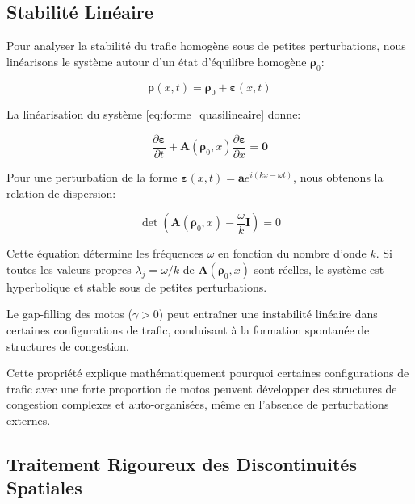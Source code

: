 \subsection{Stabilité Linéaire}
\label{subsec:stabilite_lineaire}

Pour analyser la stabilité du trafic homogène sous de petites perturbations, nous linéarisons le système autour d'un état d'équilibre homogène $\boldsymbol{\rho}_0$:

\begin{equation}
\boldsymbol{\rho}(x,t) = \boldsymbol{\rho}_0 + \boldsymbol{\varepsilon}(x,t)
\end{equation}

La linéarisation du système \eqref{eq:forme_quasilineaire} donne:

\begin{equation}
\frac{\partial \boldsymbol{\varepsilon}}{\partial t} + \mathbf{A}(\boldsymbol{\rho}_0, x) \frac{\partial \boldsymbol{\varepsilon}}{\partial x} = \mathbf{0}
\end{equation}

Pour une perturbation de la forme $\boldsymbol{\varepsilon}(x,t) = \boldsymbol{a} e^{i(kx-\omega t)}$, nous obtenons la relation de dispersion:

\begin{equation}
\det(\mathbf{A}(\boldsymbol{\rho}_0, x) - \frac{\omega}{k}\mathbf{I}) = 0
\end{equation}

Cette équation détermine les fréquences $\omega$ en fonction du nombre d'onde $k$. Si toutes les valeurs propres $\lambda_j = \omega/k$ de $\mathbf{A}(\boldsymbol{\rho}_0, x)$ sont réelles, le système est hyperbolique et stable sous de petites perturbations.

\begin{proposition}
Le gap-filling des motos ($\gamma > 0$) peut entraîner une instabilité linéaire dans certaines configurations de trafic, conduisant à la formation spontanée de structures de congestion.
\end{proposition}

Cette propriété explique mathématiquement pourquoi certaines configurations de trafic avec une forte proportion de motos peuvent développer des structures de congestion complexes et auto-organisées, même en l'absence de perturbations externes.

\subsection{Traitement Rigoureux des Discontinuités Spatiales}
\label{subsec:traitement_discontinuites}

